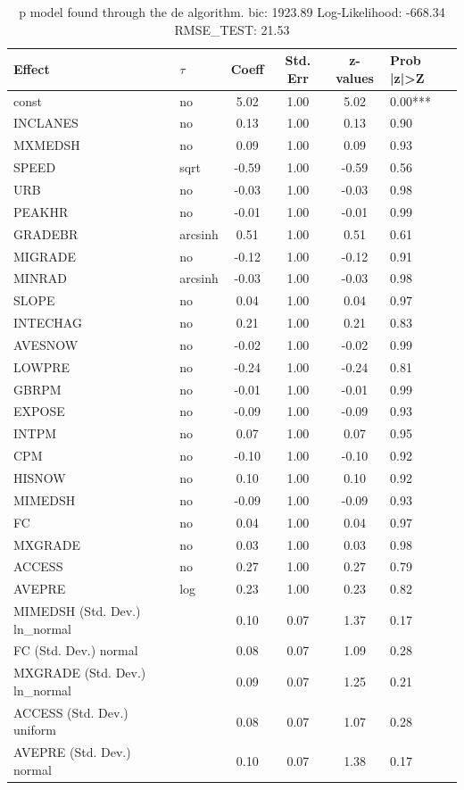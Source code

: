 \begin{table}
	\caption{p model found through the de algorithm. bic: 1923.89 Log-Likelihood: -668.34 RMSE_TEST: 21.53}
	\begin{center}
		\begin{tabular}{|l|l|c|c|c|l|}
			\hline
			Effect & $\tau$ & Coeff & Std. Err & z-values & Prob |z|>Z \\
			\hline
			const & no & 5.02 & 1.00 & 5.02 & 0.00*** \\
			\hline
			INCLANES & no & 0.13 & 1.00 & 0.13 & 0.90 \\
			\hline
			MXMEDSH & no & 0.09 & 1.00 & 0.09 & 0.93 \\
			\hline
			SPEED & sqrt & -0.59 & 1.00 & -0.59 & 0.56 \\
			\hline
			URB & no & -0.03 & 1.00 & -0.03 & 0.98 \\
			\hline
			PEAKHR & no & -0.01 & 1.00 & -0.01 & 0.99 \\
			\hline
			GRADEBR & arcsinh & 0.51 & 1.00 & 0.51 & 0.61 \\
			\hline
			MIGRADE & no & -0.12 & 1.00 & -0.12 & 0.91 \\
			\hline
			MINRAD & arcsinh & -0.03 & 1.00 & -0.03 & 0.98 \\
			\hline
			SLOPE & no & 0.04 & 1.00 & 0.04 & 0.97 \\
			\hline
			INTECHAG & no & 0.21 & 1.00 & 0.21 & 0.83 \\
			\hline
			AVESNOW & no & -0.02 & 1.00 & -0.02 & 0.99 \\
			\hline
			LOWPRE & no & -0.24 & 1.00 & -0.24 & 0.81 \\
			\hline
			GBRPM & no & -0.01 & 1.00 & -0.01 & 0.99 \\
			\hline
			EXPOSE & no & -0.09 & 1.00 & -0.09 & 0.93 \\
			\hline
			INTPM & no & 0.07 & 1.00 & 0.07 & 0.95 \\
			\hline
			CPM & no & -0.10 & 1.00 & -0.10 & 0.92 \\
			\hline
			HISNOW & no & 0.10 & 1.00 & 0.10 & 0.92 \\
			\hline
			MIMEDSH & no & -0.09 & 1.00 & -0.09 & 0.93 \\
			\hline
			FC & no & 0.04 & 1.00 & 0.04 & 0.97 \\
			\hline
			MXGRADE & no & 0.03 & 1.00 & 0.03 & 0.98 \\
			\hline
			ACCESS & no & 0.27 & 1.00 & 0.27 & 0.79 \\
			\hline
			AVEPRE & log & 0.23 & 1.00 & 0.23 & 0.82 \\
			\hline
			MIMEDSH (Std. Dev.) ln_normal &  & 0.10 & 0.07 & 1.37 & 0.17 \\
			\hline
			FC (Std. Dev.) normal &  & 0.08 & 0.07 & 1.09 & 0.28 \\
			\hline
			MXGRADE (Std. Dev.) ln_normal &  & 0.09 & 0.07 & 1.25 & 0.21 \\
			\hline
			ACCESS (Std. Dev.) uniform &  & 0.08 & 0.07 & 1.07 & 0.28 \\
			\hline
			AVEPRE (Std. Dev.) normal &  & 0.10 & 0.07 & 1.38 & 0.17 \\
			\hline
		\end{tabular}
	\end{center}
\end{table}